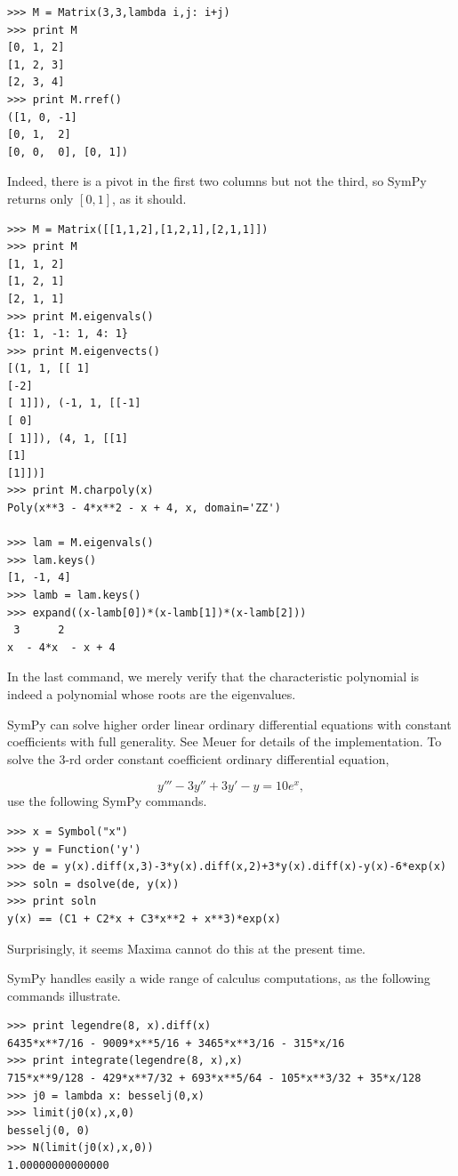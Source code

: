 \documentclass[12pt]{article}
\begin{document}
\begin{Verbatim}[fontsize=\scriptsize,fontfamily=courier,fontshape=tt,frame=single,label=SymPy]
>>> M = Matrix(3,3,lambda i,j: i+j)
>>> print M
[0, 1, 2]
[1, 2, 3]
[2, 3, 4]
>>> print M.rref()
([1, 0, -1]
[0, 1,  2]
[0, 0,  0], [0, 1])
\end{Verbatim}

\noindent
Indeed, there is a pivot in the first two columns but not the
third, so SymPy returns only $[0,1]$, as it should.

\begin{Verbatim}[fontsize=\scriptsize,fontfamily=courier,fontshape=tt,frame=single,label=SymPy]
>>> M = Matrix([[1,1,2],[1,2,1],[2,1,1]])
>>> print M
[1, 1, 2]
[1, 2, 1]
[2, 1, 1]
>>> print M.eigenvals()
{1: 1, -1: 1, 4: 1}
>>> print M.eigenvects()
[(1, 1, [[ 1]
[-2]
[ 1]]), (-1, 1, [[-1]
[ 0]
[ 1]]), (4, 1, [[1]
[1]
[1]])]
>>> print M.charpoly(x)
Poly(x**3 - 4*x**2 - x + 4, x, domain='ZZ')

>>> lam = M.eigenvals()
>>> lam.keys()
[1, -1, 4]
>>> lamb = lam.keys()
>>> expand((x-lamb[0])*(x-lamb[1])*(x-lamb[2]))
 3      2
x  - 4*x  - x + 4
\end{Verbatim}

\noindent
In the last command, we merely verify that the characteristic
polynomial is indeed a polynomial whose roots are the eigenvalues.

SymPy can solve higher order linear ordinary differential equations with constant coefficients with full generality.
See Meuer \cite{M} for details of the implementation.
To solve the $3$-rd order constant coefficient ordinary differential
equation,

\[
y'''-3y''+3y'-y=10e^x,
\]
use the following SymPy commands.

\begin{Verbatim}[fontsize=\scriptsize,fontfamily=courier,fontshape=tt,frame=single,label=SymPy]
>>> x = Symbol("x")
>>> y = Function('y')
>>> de = y(x).diff(x,3)-3*y(x).diff(x,2)+3*y(x).diff(x)-y(x)-6*exp(x)
>>> soln = dsolve(de, y(x))
>>> print soln
y(x) == (C1 + C2*x + C3*x**2 + x**3)*exp(x)
\end{Verbatim}

\noindent
Surprisingly, it seems Maxima cannot do this at the present time.

SymPy handles easily a wide range of calculus computations, as the following
commands illustrate.

\begin{Verbatim}[fontsize=\scriptsize,fontfamily=courier,fontshape=tt,frame=single,label=SymPy]
>>> print legendre(8, x).diff(x)
6435*x**7/16 - 9009*x**5/16 + 3465*x**3/16 - 315*x/16
>>> print integrate(legendre(8, x),x)
715*x**9/128 - 429*x**7/32 + 693*x**5/64 - 105*x**3/32 + 35*x/128
>>> j0 = lambda x: besselj(0,x)
>>> limit(j0(x),x,0)
besselj(0, 0)
>>> N(limit(j0(x),x,0))
1.00000000000000
\end{Verbatim}
\end{document}
